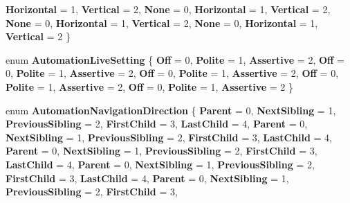 \begin{DoxyCompactItemize}
{\bfseries Horizontal} = 1, 
{\bfseries Vertical} = 2, 
{\bfseries None} = 0, 
{\bfseries Horizontal} = 1, 
\newline
{\bfseries Vertical} = 2, 
{\bfseries None} = 0, 
{\bfseries Horizontal} = 1, 
{\bfseries Vertical} = 2, 
\newline
{\bfseries None} = 0, 
{\bfseries Horizontal} = 1, 
{\bfseries Vertical} = 2
 \}
\item 
\mbox{\label{namespace_windows_1_1_u_i_1_1_xaml_1_1_automation_1_1_peers_a3a01b3ce21eb110af096e897e16e1c78}} 
enum {\bfseries Automation\+Live\+Setting} \{ \newline
{\bfseries Off} = 0, 
{\bfseries Polite} = 1, 
{\bfseries Assertive} = 2, 
{\bfseries Off} = 0, 
\newline
{\bfseries Polite} = 1, 
{\bfseries Assertive} = 2, 
{\bfseries Off} = 0, 
{\bfseries Polite} = 1, 
\newline
{\bfseries Assertive} = 2, 
{\bfseries Off} = 0, 
{\bfseries Polite} = 1, 
{\bfseries Assertive} = 2, 
\newline
{\bfseries Off} = 0, 
{\bfseries Polite} = 1, 
{\bfseries Assertive} = 2
 \}
\item 
\mbox{\label{namespace_windows_1_1_u_i_1_1_xaml_1_1_automation_1_1_peers_a9b8626451e301972334ca5697b978934}} 
enum {\bfseries Automation\+Navigation\+Direction} \{ \newline
{\bfseries Parent} = 0, 
{\bfseries Next\+Sibling} = 1, 
{\bfseries Previous\+Sibling} = 2, 
{\bfseries First\+Child} = 3, 
\newline
{\bfseries Last\+Child} = 4, 
{\bfseries Parent} = 0, 
{\bfseries Next\+Sibling} = 1, 
{\bfseries Previous\+Sibling} = 2, 
\newline
{\bfseries First\+Child} = 3, 
{\bfseries Last\+Child} = 4, 
{\bfseries Parent} = 0, 
{\bfseries Next\+Sibling} = 1, 
\newline
{\bfseries Previous\+Sibling} = 2, 
{\bfseries First\+Child} = 3, 
{\bfseries Last\+Child} = 4, 
{\bfseries Parent} = 0, 
\newline
{\bfseries Next\+Sibling} = 1, 
{\bfseries Previous\+Sibling} = 2, 
{\bfseries First\+Child} = 3, 
{\bfseries Last\+Child} = 4, 
\newline
{\bfseries Parent} = 0, 
{\bfseries Next\+Sibling} = 1, 
{\bfseries Previous\+Sibling} = 2, 
{\bfseries First\+Child} = 3, 

\end{DoxyCompactItemize}
